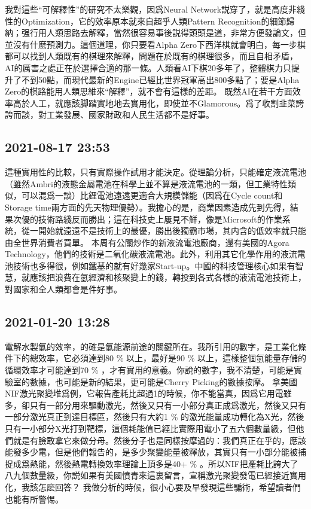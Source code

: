 \documentclass[twocolumn]{ctexart}
\begin{document}
我對這些“可解釋性”的研究不太樂觀，因爲Neural Network説穿了，就是高度非綫性的Optimization，它的效率原本就來自超乎人類Pattern Recognition的細節歸納；强行用人類思路去解釋，當然很容易事後説得頭頭是道，非常方便發論文，但並沒有什麽預測力。這個道理，你只要看Alpha Zero下西洋棋就會明白，每一步棋都可以找到人類既有的棋理來解釋，問題在於既有的棋理很多，而且自相矛盾，AI的厲害之處正在於選擇合適的那一條。人類看AI下棋20多年了，整體棋力只提升了不到50點，而現代最新的Engine已經比世界冠軍高出800多點了；要是Alpha Zero的棋路能用人類思維來“解釋”，就不會有這樣的差距。
既然AI在若干方面效率高於人工，就應該脚踏實地地去實用化，即使並不Glamorous。爲了收割韭菜誇誇而談，對工業發展、國家財政和人民生活都不是好事。
\subsection*{2021-08-17 23:53}

這種實用性的比較，只有實際操作試用才能決定。從理論分析，只能確定液流電池（雖然Ambri的液態金屬電池在科學上並不算是液流電池的一類，但工業特性類似，可以混爲一談）比鋰電池遠遠更適合大規模儲能（因爲在Cycle count和Storage time兩方面的先天物理優勢）。我擔心的是，商業因素造成先到先得，結果次優的技術路綫反而勝出；這在科技史上屢見不鮮，像是Microsoft的作業系統，從一開始就遠遠不是技術上的最優，勝出後獨霸市場，其内含的低效率就只能由全世界消費者買單。
本周有公關炒作的新液流電池廠商，還有美國的Agora Technology，他們的技術是二氧化碳液流電池。此外，利用其它化學作用的液流電池技術也多得很，例如鐵基的就有好幾家Start-up。中國的科技管理核心如果有智慧，就應該把浪費在氫經濟和核聚變上的錢，轉投到各式各樣的液流電池技術上，對國家和全人類都會是件好事。
\subsection*{2021-01-20 13:28}

電解水製氫的效率，的確是氫能源前途的關鍵所在。我所引用的數字，是工業化條件下的總效率，它必須達到80 \% 以上，最好是90 \% 以上，這樣整個氫能量存儲的循環效率才可能達到70 \% ，才有實用的意義。你說的數字，我不清楚，可能是實驗室的數據，也可能是新的結果，更可能是Cherry Picking的數據按摩。
拿美國NIF激光聚變堆爲例，它報告產耗比超過1的時候，你不能當真，因爲它用電雖多，卻只有一部分用來驅動激光，然後又只有一小部分真正成爲激光，然後又只有一部分激光真正到達目標區，然後只有大約1 \% 的激光能量成功轉化為X光，然後只有一小部分X光打到靶標，這個耗能值已經比實際用電小了五六個數量級，但他們就是有臉敢拿它來做分母。然後分子也是同樣按摩過的：我們真正在乎的，應該能發多少電，但是他們報告的，是多少聚變能量被釋放，其實只有一小部分能被捕捉成爲熱能，然後熱電轉換效率理論上頂多是40+ \% 。所以NIF把產耗比誇大了八九個數量級，你説如果有美國憤青來這裏留言，宣稱激光聚變發電已經接近實用化，我該怎麽回答？
我做分析的時候，很小心要及早發現這些騙術，希望讀者們也能有所警惕。
\end{document}
